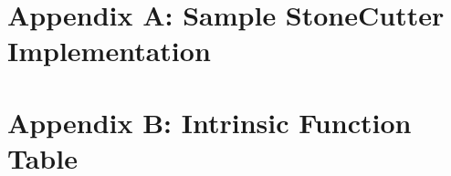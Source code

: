 \documentclass{article}
\begin{document}
\clearpage
\section{Appendix A: Sample StoneCutter Implementation}
\label{sec:AppendixA}

\vspace{0.125in}


\clearpage
\section{Appendix B: Intrinsic Function Table}
\label{sec:AppendixB}
\end{document}
